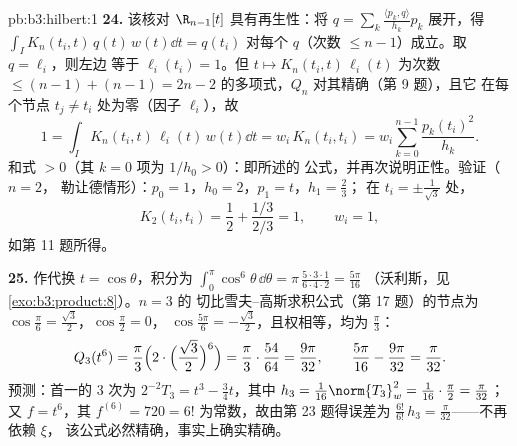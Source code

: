 \begin{solution}{pb:b3:hilbert:1}
\textbf{24.} 该核对 $\R_{n-1}[t]$ 具有再生性：将
$q = \sum_k\frac{\langle p_k, q\rangle}{h_k}p_k$ 展开，得
$\int_I K_n(t_i, t)\,q(t)\,w(t)\dd t = q(t_i)$ 对每个
$q$（次数 $\leq n - 1$）成立。取 $q = \ell_i$，则左边
等于 $\ell_i(t_i) = 1$。但 $t \mapsto K_n(t_i,
t)\,\ell_i(t)$ 为次数 $\leq (n - 1) + (n
- 1) = 2n - 2$ 的多项式，$Q_n$ 对其精确（第 9 题），且它
在每个节点 $t_j \neq t_i$ 处为零（因子 $\ell_i$），故
\[
1 = \int_I K_n(t_i, t)\,\ell_i(t)\,w(t)\dd t
= w_i\,K_n(t_i, t_i)
= w_i\sum_{k=0}^{n-1}\frac{p_k(t_i)^2}{h_k} .
\]
和式 $> 0$（其 $k = 0$ 项为 $1/h_0 > 0$）：即所述的
公式，并再次说明正性。验证（$n = 2$，
勒让德情形）：$p_0 = 1$，$h_0 = 2$，$p_1 = t$，$h_1 = \frac23$；
在 $t_i = \pm\frac1{\sqrt3}$ 处，
\[
K_2(t_i, t_i) = \frac12 + \frac{1/3}{2/3} = 1,
\qquad w_i = 1,
\]
如第 11 题所得。

\textbf{25.} 作代换 $t = \cos\theta$，积分为
$\int_0^\pi\cos^6\theta\,\dd\theta =
\pi\,\frac{5\cdot3\cdot1}{6\cdot4\cdot2} = \frac{5\pi}{16}$
（沃利斯，见\cref{exo:b3:product:8}）。$n = 3$ 的
切比雪夫--高斯求积公式（第 17 题）的节点为
$\cos\frac\pi6 = \frac{\sqrt3}2$，$\cos\frac\pi2 = 0$，
$\cos\frac{5\pi}6 = -\frac{\sqrt3}2$，且权相等，均为
$\frac\pi3$：
\[
Q_3(t^6) = \frac\pi3\Bigl(2\cdot\Bigl(\frac{\sqrt3}2
\Bigr)^{6}\Bigr) = \frac\pi3\cdot\frac{54}{64}
= \frac{9\pi}{32},
\qquad
\frac{5\pi}{16} - \frac{9\pi}{32} = \frac\pi{32} .
\]
预测：首一的 $3$ 次为
$2^{-2}T_3 = t^3 - \frac34t$，其中 $h_3 =
\frac1{16}\norm{T_3}_w^2 = \frac1{16}\cdot\frac\pi2 =
\frac\pi{32}$；又 $f = t^6$，其 $f^{(6)} = 720 =
6!$ 为常数，故由第 23 题得误差为 $\frac{6!}{6!}\,h_3 =
\frac\pi{32}$——不再依赖 $\xi$，
该公式必然精确，事实上确实精确。
\end{solution}
